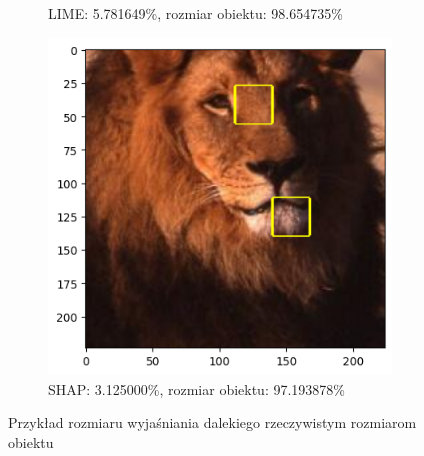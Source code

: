 \begin{figure}[h]
\begin{subfigure}[b]{0.3\textwidth}
		\caption{LIME: 5.781649\%, rozmiar obiektu: 98.654735\%}
	\end{subfigure}
	\begin{subfigure}[b]{0.3\textwidth}
		\includegraphics[width=.9\textwidth]{img/examples/appendix/n02129165_33659_shap}
		\caption{SHAP: 3.125000\%, rozmiar obiektu: 97.193878\%}
	\end{subfigure}
	\caption{Przykład rozmiaru wyjaśniania dalekiego rzeczywistym rozmiarom obiektu}
	\label{}
\end{figure}


